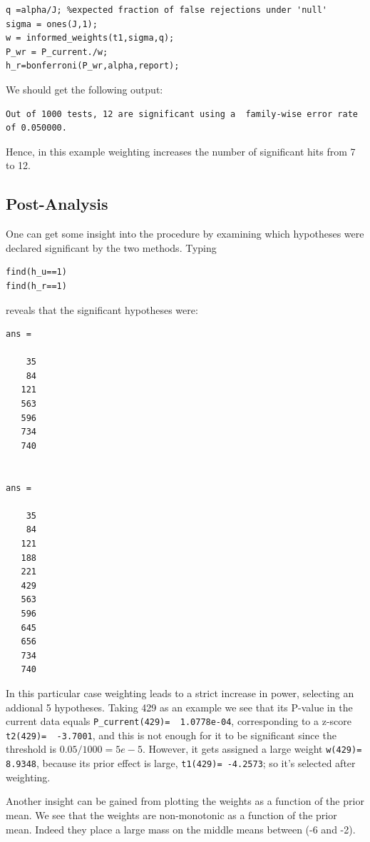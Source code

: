 \documentclass[english,11pt]{article} %
\begin{document}
\begin{verbatim}
q =alpha/J; %expected fraction of false rejections under 'null'
sigma = ones(J,1);
w = informed_weights(t1,sigma,q);
P_wr = P_current./w;
h_r=bonferroni(P_wr,alpha,report);
\end{verbatim}

We should get the following output:

\begin{verbatim}
Out of 1000 tests, 12 are significant using a  family-wise error rate  of 0.050000.
\end{verbatim}

Hence, in this example weighting increases the number of significant hits from 7 to 12.

\subsection{Post-Analysis}

One can get some insight into the procedure by examining which hypotheses were declared significant by the two methods. Typing

\begin{verbatim}
find(h_u==1)
find(h_r==1)
\end{verbatim}

reveals that the significant hypotheses were:

\begin{verbatim}
ans =

    35
    84
   121
   563
   596
   734
   740


ans =

    35
    84
   121
   188
   221
   429
   563
   596
   645
   656
   734
   740
\end{verbatim}

In this particular case weighting leads to a strict increase in power, selecting an addional 5 hypotheses. Taking 429 as an example we see that its P-value in the current data equals \verb+P_current(429)=  1.0778e-04+, corresponding to a z-score \verb+t2(429)=  -3.7001+, and this is not enough for it to be significant since the threshold is $0.05/1000=5e-5$. However, it gets assigned a large weight  \verb+w(429)=  8.9348+, because its prior  effect is large, \verb+t1(429)= -4.2573+; so it's selected after weighting.

Another insight can be gained from plotting the weights as a function of the prior mean. We see that the weights are non-monotonic as a function of the prior mean. Indeed they place a large mass on the middle means between (-6 and -2).
\end{document}
